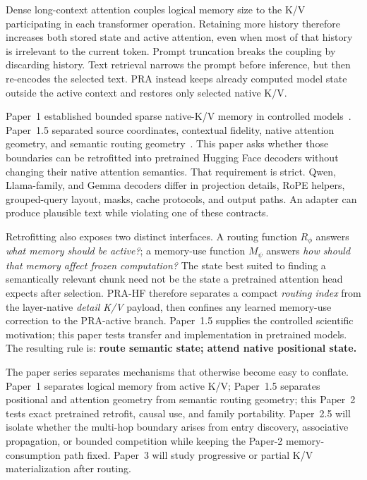 \documentclass[11pt]{article}
\begin{document}
Dense long-context attention couples logical memory size to the K/V participating in each
transformer operation. Retaining more history therefore increases both stored state and active
attention, even when most of that history is irrelevant to the current token. Prompt truncation
breaks the coupling by discarding history. Text retrieval narrows the prompt before inference,
but then re-encodes the selected text. PRA instead keeps already computed model state outside the
active context and restores only selected native K/V.

Paper~1 established bounded sparse native-K/V memory in controlled models~\cite{simao2026pra}.
Paper~1.5 separated source coordinates, contextual fidelity, native attention geometry, and
semantic routing geometry~\cite{simao2026position}. This paper asks whether those boundaries can
be retrofitted into pretrained Hugging Face decoders without
changing their native attention semantics. That requirement is strict. Qwen, Llama-family, and Gemma
decoders differ in projection details, RoPE helpers, grouped-query layout, masks, cache protocols,
and output paths. An adapter can produce plausible text while violating one of these contracts.

Retrofitting also exposes two distinct interfaces. A routing function
$R_\phi$ answers \emph{what memory should be active?}; a memory-use function $M_\psi$ answers
\emph{how should that memory affect frozen computation?} The state best suited to finding a
semantically relevant chunk need not be the state a pretrained attention head expects after
selection. PRA-HF therefore separates a compact \emph{routing index} from the layer-native
\emph{detail K/V} payload, then confines any learned memory-use correction to the PRA-active
branch. Paper~1.5 supplies the controlled scientific motivation; this paper tests transfer and
implementation in pretrained models. The resulting rule is: \textbf{route semantic state;
attend native positional state.}

The paper series separates mechanisms that otherwise become easy to conflate. Paper~1 separates
logical memory from active K/V; Paper~1.5 separates positional and attention geometry from
semantic routing geometry; this Paper~2 tests exact pretrained retrofit, causal use, and family
portability. Paper~2.5 will isolate whether the multi-hop boundary arises from entry discovery,
associative propagation, or bounded competition while keeping the Paper-2 memory-consumption path
fixed. Paper~3 will study progressive or partial K/V materialization after routing.
\end{document}
